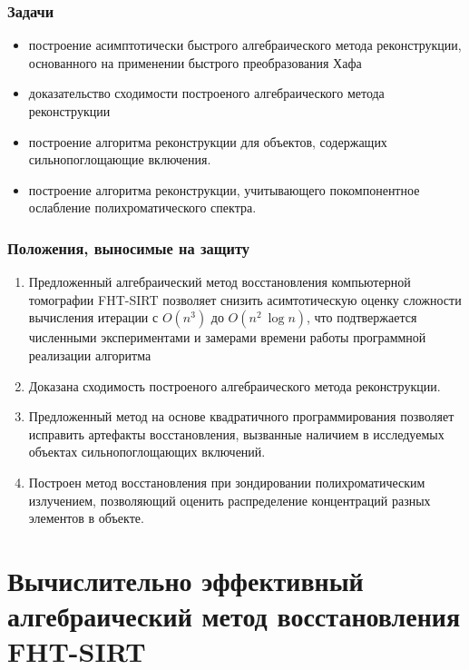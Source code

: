 \documentclass[12pt]{beamer}
\begin{document}
\begin{frame}
\frametitle{Задачи}

\begin{itemize}
  \item построение асимптотически быстрого алгебраического метода реконструкции, основанного на применении быстрого преобразования Хафа
  \item доказательство сходимости построеного алгебраического метода реконструкции
  \item построение алгоритма реконструкции для объектов, содержащих сильнопоглощающие включения.
  \item построение алгоритма реконструкции, учитывающего покомпонентное ослабление полихроматического спектра.
\end{itemize}

\end{frame}

\begingroup
\small
\begin{frame}
\frametitle{Положения, выносимые на защиту}
\begin{enumerate}
  \item Предложенный алгебраический метод восстановления компьютерной томографии FHT-SIRT позволяет снизить асимтотическую оценку сложности вычисления итерации с $O(n^3)$ до $O(n^2~\log n)$, что подтвержается численными экспериментами и замерами времени работы программной реализации алгоритма
  \item Доказана сходимость построеного алгебраического метода реконструкции. 
  \item Предложенный метод на основе квадратичного программирования позволяет исправить артефакты восстановления, вызванные наличием в исследуемых объектах сильнопоглощающих включений.
  \item Построен метод восстановления при зондировании полихроматическим излучением, позволяющий оценить распределение концентраций разных элементов в объекте.
\end{enumerate}
\end{frame}
\endgroup

\section{Вычислительно эффективный алгебраический метод восстановления FHT-SIRT}
\end{document}
